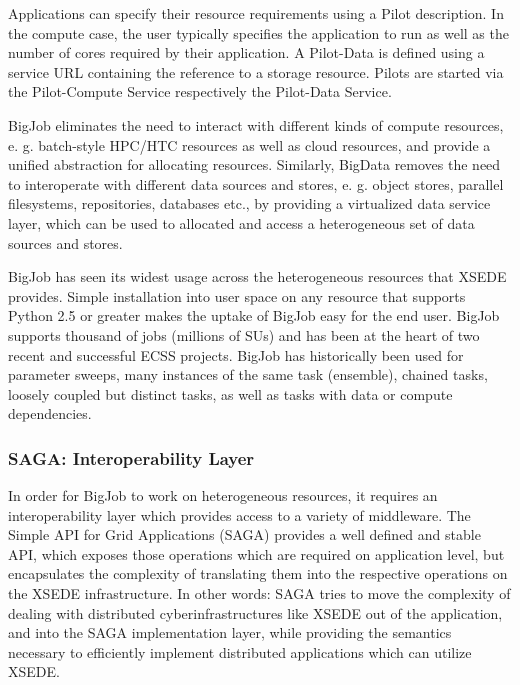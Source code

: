 \documentclass{sig-alternate}
\begin{document}
Applications can specify their resource requirements using a Pilot description. In the compute case, the user typically specifies the application to run as well as the number of cores required by their application. A Pilot-Data is defined using a service URL containing the reference to a storage resource. Pilots are started via the Pilot-Compute Service respectively the Pilot-Data Service.

BigJob eliminates the need to interact with different kinds of compute resources, e. g. batch-style HPC/HTC resources as well as cloud resources, and provide a unified abstraction for allocating resources. Similarly, BigData removes the need to interoperate with different data sources and stores, e. g. object stores, parallel filesystems, repositories, databases etc., by providing a virtualized data service layer, which can be used to allocated and access a heterogeneous set of data sources and stores.

BigJob has seen its widest usage across the heterogeneous resources that XSEDE provides. Simple installation into user space on any resource that supports Python 2.5 or greater makes the uptake of BigJob easy for the end user. BigJob supports thousand of jobs (millions of SUs) and has been at the heart of two recent and successful ECSS projects. BigJob has historically been used for parameter sweeps, many instances of the same task (ensemble), chained tasks, loosely coupled but distinct tasks, as well as tasks with data or compute dependencies.


\subsubsection{SAGA: Interoperability Layer}


In order for BigJob to work on heterogeneous resources, it requires
an interoperability layer which provides access to a variety of middleware.
The Simple API for Grid Applications (SAGA) provides a well 
defined and stable API, which exposes those operations which
are required on application level, but encapsulates the complexity 
of translating them into the respective operations on
the XSEDE infrastructure. In other words: SAGA tries to
move the complexity of dealing with distributed cyberinfrastructures 
like XSEDE out of the application, and into the 
SAGA implementation layer, while providing the semantics 
necessary to efficiently implement distributed applications 
which can utilize XSEDE.
\end{document}
